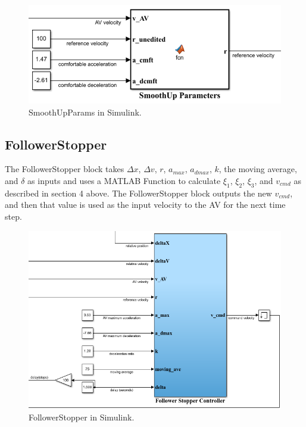 \documentclass[conference]{IEEEtran}
\begin{document}
\begin{figure}[htbp]
\centerline{\includegraphics[width=3.5 in]{smoothupparams.PNG}}
\caption{SmoothUpParams in Simulink.}
\label{fig2}
\end{figure}

\subsection{FollowerStopper}
The FollowerStopper block takes $\Delta x$, $\Delta v$, $r$, $a_{max}$, $a_{dmax}$, $k$, the moving average, and $\delta$ as inputs and uses a MATLAB Function to calculate $\xi_1$, $\xi_2$, $\xi_3$, and $v_{cmd}$ as described in section 4 above. The FollowerStopper block outputs the new $v_{cmd}$, and then that value is used as the input velocity to the AV for the next time step.

\begin{figure}[htbp]
\centerline{\includegraphics[width=3.5 in]{followerstopper.PNG}}
\caption{FollowerStopper in Simulink.}
\label{fig2}
\end{figure}
\end{document}
